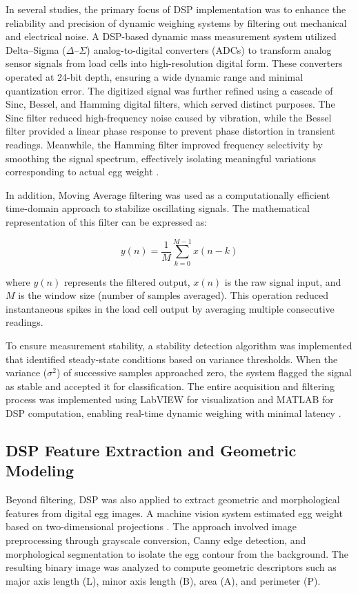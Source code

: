 \documentclass[conference]{IEEEtran}
\begin{document}
	In several studies, the primary focus of DSP implementation was to enhance the reliability and precision of dynamic weighing systems by filtering out mechanical and electrical noise. A DSP-based dynamic mass measurement system utilized Delta--Sigma ($\Delta$--$\Sigma$) analog-to-digital converters (ADCs) to transform analog sensor signals from load cells into high-resolution digital form. These converters operated at 24-bit depth, ensuring a wide dynamic range and minimal quantization error. The digitized signal was further refined using a cascade of Sinc, Bessel, and Hamming digital filters, which served distinct purposes. The Sinc filter reduced high-frequency noise caused by vibration, while the Bessel filter provided a linear phase response to prevent phase distortion in transient readings. Meanwhile, the Hamming filter improved frequency selectivity by smoothing the signal spectrum, effectively isolating meaningful variations corresponding to actual egg weight \cite{yabanova2017}.
	
	In addition, Moving Average filtering was used as a computationally efficient time-domain approach to stabilize oscillating signals. The mathematical representation of this filter can be expressed as:
	
	\[
	y(n) = \frac{1}{M} \sum_{k=0}^{M-1} x(n-k)
	\]
	
	where \(y(n)\) represents the filtered output, \(x(n)\) is the raw signal input, and \(M\) is the window size (number of samples averaged). This operation reduced instantaneous spikes in the load cell output by averaging multiple consecutive readings.
	
	To ensure measurement stability, a stability detection algorithm was implemented that identified steady-state conditions based on variance thresholds. When the variance (\(\sigma^2\)) of successive samples approached zero, the system flagged the signal as stable and accepted it for classification. The entire acquisition and filtering process was implemented using LabVIEW for visualization and MATLAB for DSP computation, enabling real-time dynamic weighing with minimal latency \cite{yabanova2017}.
	
	\subsection{DSP Feature Extraction and Geometric Modeling}
	
	Beyond filtering, DSP was also applied to extract geometric and morphological features from digital egg images. A machine vision system estimated egg weight based on two-dimensional projections \cite{asadi2010}. The approach involved image preprocessing through grayscale conversion, Canny edge detection, and morphological segmentation to isolate the egg contour from the background. The resulting binary image was analyzed to compute geometric descriptors such as major axis length (L), minor axis length (B), area (A), and perimeter (P).
	
\end{document}
